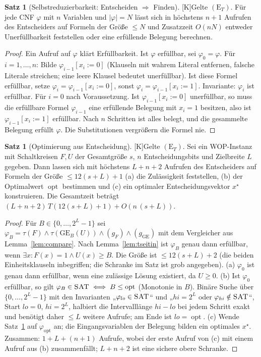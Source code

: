 \documentclass[a4paper,12pt]{article}
\theoremstyle{definition}
\newtheorem{satz}[definition]{Satz}
\newcommand{\tK}{\textsf{\small[K]}}   %
\newcommand{\SAT}{\textsc{SAT}}
\newcommand{\ET}{(\mathrm{E}_{T})}
\newcommand{\opt}{\operatorname{opt}}
\begin{document}
\begin{satz}[Selbstreduzierbarkeit: Entscheiden \(\Rightarrow\) Finden]\tK\label{satz:selfred}
Gelte \(\ET\). Für jede CNF \(\varphi\) mit \(n\) Variablen und \(|\varphi|=N\) lässt sich in höchstens \(n+1\) Aufrufen des Entscheiders auf Formeln der Größe \(\le N\) und Zusatzzeit \(O(nN)\) entweder Unerfüllbarkeit feststellen oder eine erfüllende Belegung berechnen.
\end{satz}
\begin{proof}
Ein Aufruf auf \(\varphi\) klärt Erfüllbarkeit. Ist \(\varphi\) erfüllbar, sei \(\varphi_0=\varphi\). Für \(i=1,\dots,n\): Bilde \(\varphi_{i-1}[x_i{:=}0]\) (Klauseln mit wahrem Literal entfernen, falsche Literale streichen; eine leere Klausel bedeutet unerfüllbar). Ist diese Formel erfüllbar, setze \(\varphi_i=\varphi_{i-1}[x_i{:=}0]\), sonst \(\varphi_i=\varphi_{i-1}[x_i{:=}1]\). Invariante: \(\varphi_{i}\) ist erfüllbar. Für \(i=0\) nach Voraussetzung. Ist \(\varphi_{i-1}[x_i{:=}0]\) unerfüllbar, so muss die erfüllbare Formel \(\varphi_{i-1}\) eine erfüllende Belegung mit \(x_i=1\) besitzen, also ist \(\varphi_{i-1}[x_i{:=}1]\) erfüllbar. Nach \(n\) Schritten ist alles belegt, und die gesammelte Belegung erfüllt \(\varphi\). Die Substitutionen vergrößern die Formel nie.
\end{proof}

\begin{satz}[Optimierung aus Entscheidung]\tK\label{satz:opt}
Gelte \(\ET\). Sei ein WOP-Instanz mit Schaltkreisen \(F,U\) der Gesamtgröße \(s\), \(n\) Entscheidungsbits und Zielbreite \(L\) gegeben. Dann lassen sich mit höchstens \(L+n+2\) Aufrufen des Entscheiders auf Formeln der Größe \(\le 12(s+L)+1\) (a) die Zulässigkeit feststellen, (b) der Optimalwert \(\opt\) bestimmen und (c) ein optimaler Entscheidungsvektor \(x^\star\) konstruieren. Die Gesamtzeit beträgt \((L+n+2)\,T(12(s+L)+1)+O(n\,(s+L))\).
\end{satz}
\begin{proof}
Für \(B\in\{0,\dots,2^L-1\}\) sei \(\varphi_B=\tau(F)\wedge\tau(\mathrm{GE}_B(U))\wedge(g_F)\wedge(g_{\mathrm{GE}})\) mit dem Vergleicher aus Lemma~\ref{lem:compare}. Nach Lemma~\ref{lem:tseitin} ist \(\varphi_B\) genau dann erfüllbar, wenn \(\exists x:F(x)=1\wedge U(x)\ge B\). Die Größe ist \(\le12(s+L)+2\) (die beiden Einheitsklauseln inbegriffen; die Schranke im Satz ist grob angegeben).
(a) \(\varphi_0\) ist genau dann erfüllbar, wenn eine zulässige Lösung existiert, da \(U\ge0\).
(b) Ist \(\varphi_0\) erfüllbar, so gilt \(\varphi_B\in\SAT\iff B\le\opt\) (Monotonie in \(B\)). Binäre Suche über \(\{0,\dots,2^L-1\}\) mit den Invarianten „\(\varphi_{lo}\in\SAT\)“ und „\(hi=2^L\) oder \(\varphi_{hi}\notin\SAT\)“, Start \(lo=0\), \(hi=2^L\), halbiert die Intervalllänge \(hi-lo\) bei jedem Schritt exakt und benötigt daher \(\le L\) weitere Aufrufe; am Ende ist \(lo=\opt\).
(c) Wende Satz~\ref{satz:selfred} auf \(\varphi_{\opt}\) an; die Eingangsvariablen der Belegung bilden ein optimales \(x^\star\). Zusammen: \(1+L+(n+1)\) Aufrufe, wobei der erste Aufruf von (c) mit einem Aufruf aus (b) zusammenfällt; \(L+n+2\) ist eine sichere obere Schranke.
\end{proof}
\end{document}
